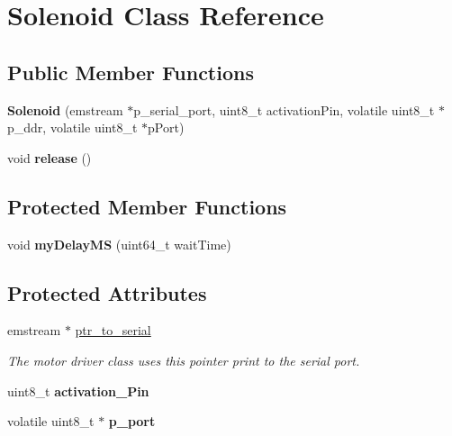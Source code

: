 \hypertarget{classSolenoid}{\section{\-Solenoid \-Class \-Reference}
\label{classSolenoid}
}
\subsection*{\-Public \-Member \-Functions}
\begin{DoxyCompactItemize}
\item 
\hypertarget{classSolenoid_a83b25ad3755398632b28d7b5bd4ca712}{{\bfseries \-Solenoid} (emstream $\ast$p\-\_\-serial\-\_\-port, uint8\-\_\-t activation\-Pin, volatile uint8\-\_\-t $\ast$p\-\_\-ddr, volatile uint8\-\_\-t $\ast$p\-Port)}\label{classSolenoid_a83b25ad3755398632b28d7b5bd4ca712}

\item 
\hypertarget{classSolenoid_a5a5bd494d2e3e46abe5c8eb396b1d79f}{void {\bfseries release} ()}\label{classSolenoid_a5a5bd494d2e3e46abe5c8eb396b1d79f}

\end{DoxyCompactItemize}
\subsection*{\-Protected \-Member \-Functions}
\begin{DoxyCompactItemize}
\item 
\hypertarget{classSolenoid_a61f850270e01a1ca7c01eb71d646e40c}{void {\bfseries my\-Delay\-M\-S} (uint64\-\_\-t wait\-Time)}\label{classSolenoid_a61f850270e01a1ca7c01eb71d646e40c}

\end{DoxyCompactItemize}
\subsection*{\-Protected \-Attributes}
\begin{DoxyCompactItemize}
\item 
\hypertarget{classSolenoid_a2c5ec464ee689cd50dc2b78af63b6b1a}{emstream $\ast$ \hyperlink{classSolenoid_a2c5ec464ee689cd50dc2b78af63b6b1a}{ptr\-\_\-to\-\_\-serial}}\label{classSolenoid_a2c5ec464ee689cd50dc2b78af63b6b1a}

\begin{DoxyCompactList}\small\item\em \-The motor driver class uses this pointer print to the serial port. \end{DoxyCompactList}\item 
\hypertarget{classSolenoid_a4522d0efbfa5e9daa1bdad187aa694e3}{uint8\-\_\-t {\bfseries activation\-\_\-\-Pin}}\label{classSolenoid_a4522d0efbfa5e9daa1bdad187aa694e3}

\item 
\hypertarget{classSolenoid_ae8e39619705357654ca18c68c1a8c9fa}{volatile uint8\-\_\-t $\ast$ {\bfseries p\-\_\-port}}\label{classSolenoid_ae8e39619705357654ca18c68c1a8c9fa}

\end{DoxyCompactItemize}


